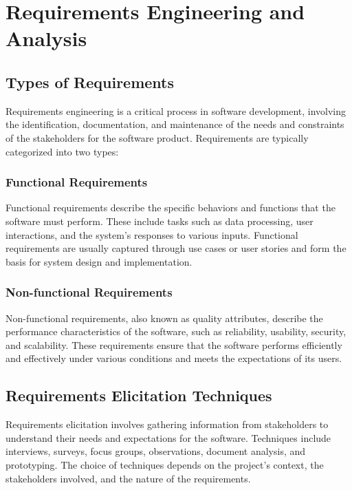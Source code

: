 \begin{refsection}
\begin{multicols}{2}
{}
\end{multicols}
\newpage

\section{Requirements Engineering and Analysis}
\begin{multicols}{2}
{\small

\subsection{Types of Requirements}

Requirements engineering is a critical process in software development, involving the identification, documentation, and maintenance of the needs and constraints of the stakeholders for the software product. Requirements are typically categorized into two types:

\subsubsection{Functional Requirements}

Functional requirements describe the specific behaviors and functions that the software must perform. These include tasks such as data processing, user interactions, and the system's responses to various inputs. Functional requirements are usually captured through use cases or user stories and form the basis for system design and implementation.

\subsubsection{Non-functional Requirements}

Non-functional requirements, also known as quality attributes, describe the performance characteristics of the software, such as reliability, usability, security, and scalability. These requirements ensure that the software performs efficiently and effectively under various conditions and meets the expectations of its users.

\subsection{Requirements Elicitation Techniques}

Requirements elicitation involves gathering information from stakeholders to understand their needs and expectations for the software. Techniques include interviews, surveys, focus groups, observations, document analysis, and prototyping. The choice of techniques depends on the project's context, the stakeholders involved, and the nature of the requirements.

}
\end{multicols}
\end{refsection}
